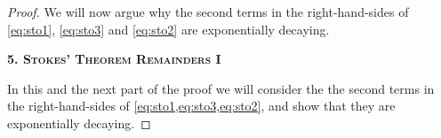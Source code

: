 \documentclass[
	fontsize=11pt, 
	twoside=false, 
	abstract=true, 
	a4paper,
]{scrartcl}
\newcommand{\eps}{\varepsilon}
\newcommand{\CC}{\mathbb{C}}
\newcommand{\dd}{\mathrm{d}}
\newcommand{\del}{\partial}
\newcommand{\supp}{\mathrm{supp}}
\newcommand{\td}[1]{\tilde{#1}}
\newcommand{\mf}[1]{\oldmathbb{#1}}
\newcommand{\bsc}[1]{\textbf{\ebgaramond\textsc{#1}}}
\begin{document}
\begin{proof}


	
	We will now argue why the second terms in the right-hand-sides of \cref{eq:sto1}, \cref{eq:sto3} and \cref{eq:sto2} are exponentially decaying. %
	
	\bsc{5. Stokes' Theorem Remainders I}

	In this and the next part of the proof we will consider the the second terms in the right-hand-sides of \cref{eq:sto1,eq:sto3,eq:sto2}, and %
	show that they are exponentially decaying. 
	

\end{proof}
\end{document}
